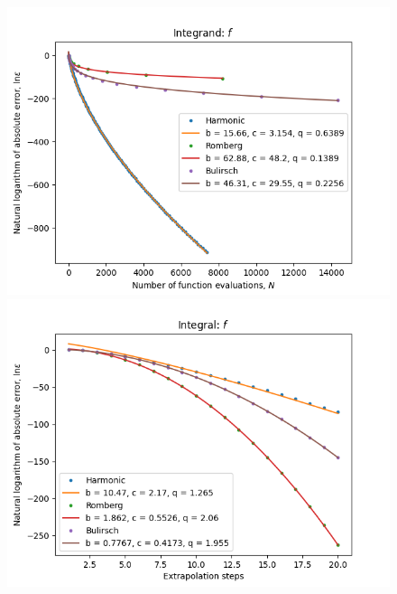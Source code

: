 \begin{figure}[H]
\centering
\begin{minipage}{0.45\textwidth}
\centering
\includegraphics[scale=0.45]{../results/romberg_plots/cos_squared_hp_trend.png}
\end{minipage}
\begin{minipage}{0.45\textwidth}
\centering
\includegraphics[scale=0.45]{../results/romberg_plots/cos_squared_hp_steps.png}
\end{minipage}
\end{figure}

